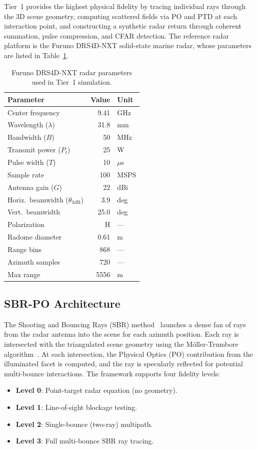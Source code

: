 \documentclass[conf]{new-aiaa}
\begin{document}
Tier~1 provides the highest physical fidelity by tracing individual rays through the 3D scene geometry, computing scattered fields via PO and PTD at each interaction point, and constructing a synthetic radar return through coherent summation, pulse compression, and CFAR detection. The reference radar platform is the Furuno DRS4D-NXT solid-state marine radar, whose parameters are listed in Table~\ref{tab:radar_params}.

\begin{table}[htb]
\centering
\caption{Furuno DRS4D-NXT radar parameters used in Tier~1 simulation.}
\label{tab:radar_params}
\begin{tabular}{@{}lrl@{}}
\toprule
\textbf{Parameter} & \textbf{Value} & \textbf{Unit} \\
\midrule
Center frequency & 9.41 & GHz \\
Wavelength ($\lambda$) & 31.8 & mm \\
Bandwidth ($B$) & 50 & MHz \\
Transmit power ($P_t$) & 25 & W \\
Pulse width ($T$) & 10 & $\mu$s \\
Sample rate & 100 & MSPS \\
Antenna gain ($G$) & 22 & dBi \\
Horiz.\ beamwidth ($\theta_{\mathrm{3dB}}$) & 3.9 & deg \\
Vert.\ beamwidth & 25.0 & deg \\
Polarization & H & --- \\
Radome diameter & 0.61 & m \\
Range bins & 868 & --- \\
Azimuth samples & 720 & --- \\
Max range & 5556 & m \\
\bottomrule
\end{tabular}
\end{table}

\subsection{SBR-PO Architecture}
The Shooting and Bouncing Rays (SBR) method~\cite{Ling1989} launches a dense fan of rays from the radar antenna into the scene for each azimuth position. Each ray is intersected with the triangulated scene geometry using the M\"{o}ller-Trumbore algorithm~\cite{MollerTrumbore1997}. At each intersection, the Physical Optics (PO) contribution from the illuminated facet is computed, and the ray is specularly reflected for potential multi-bounce interactions. The framework supports four fidelity levels:
\begin{itemize}
    \item \textbf{Level 0}: Point-target radar equation (no geometry).
    \item \textbf{Level 1}: Line-of-sight blockage testing.
    \item \textbf{Level 2}: Single-bounce (two-ray) multipath.
    \item \textbf{Level 3}: Full multi-bounce SBR ray tracing.
\end{itemize}
\end{document}
